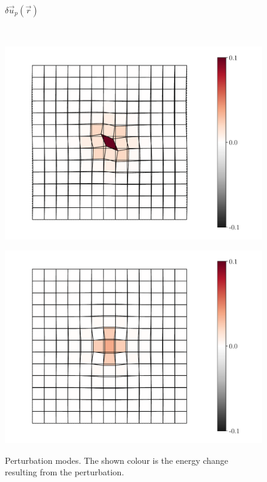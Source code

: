 \documentclass[fleqn]{goose-article}
\begin{document}
\begin{figure}[htp]
\begin{minipage}[t]{.49\textwidth}
{            $\delta \vec{u}_p (\vec{r})$
        }
        \label{fig:perturbation:pure-shear:pos}
    \end{minipage}
    \\
    \begin{minipage}[t]{.49\textwidth}
        \centering
        \includegraphics[width=\textwidth]{perturbation_simple-shear_neg.pdf}
        \label{fig:perturbation:simple-shear:neg}
    \end{minipage}
    \hfill
    \begin{minipage}[t]{.49\textwidth}
        \centering
        \includegraphics[width=\textwidth]{perturbation_pure-shear_neg.pdf}
        \label{fig:perturbation:pure-shear:neg}
    \end{minipage}
    \caption{
        Perturbation modes.
        The shown colour is the energy change resulting from the perturbation.
    }
    \label{fig:perturbation}
\end{figure}
\end{document}
